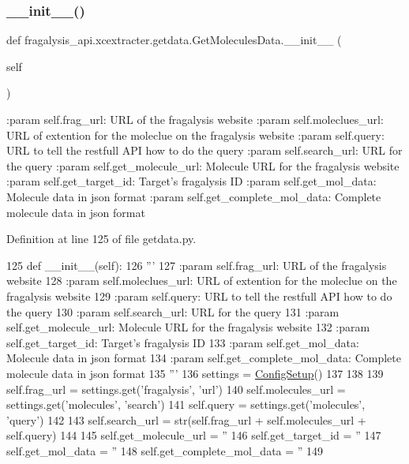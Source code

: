 \subsubsection{\texorpdfstring{\+\_\+\+\_\+init\+\_\+\+\_\+()}{\_\_init\_\_()}}
{\footnotesize\ttfamily def fragalysis\+\_\+api.\+xcextracter.\+getdata.\+Get\+Molecules\+Data.\+\_\+\+\_\+init\+\_\+\+\_\+ (\begin{DoxyParamCaption}\item[{}]{self }\end{DoxyParamCaption})}

\begin{DoxyVerb}:param self.frag_url: URL of the fragalysis website
:param self.moleclues_url: URL of extention for the moleclue on the fragalysis website
:param self.query: URL to tell the restfull API how to do the query
:param self.search_url: URL for the query 
:param self.get_molecule_url: Molecule URL for the fragalysis website
:param self.get_target_id: Target's fragalysis ID 
:param self.get_mol_data: Molecule data in json format
:param self.get_complete_mol_data: Complete molecule data in json format
\end{DoxyVerb}
 

Definition at line 125 of file getdata.\+py.


\begin{DoxyCode}
125     \textcolor{keyword}{def }\_\_init\_\_(self):
126         \textcolor{stringliteral}{'''}
127 \textcolor{stringliteral}{        :param self.frag\_url: URL of the fragalysis website}
128 \textcolor{stringliteral}{        :param self.moleclues\_url: URL of extention for the moleclue on the fragalysis website}
129 \textcolor{stringliteral}{        :param self.query: URL to tell the restfull API how to do the query}
130 \textcolor{stringliteral}{        :param self.search\_url: URL for the query }
131 \textcolor{stringliteral}{        :param self.get\_molecule\_url: Molecule URL for the fragalysis website}
132 \textcolor{stringliteral}{        :param self.get\_target\_id: Target's fragalysis ID }
133 \textcolor{stringliteral}{        :param self.get\_mol\_data: Molecule data in json format}
134 \textcolor{stringliteral}{        :param self.get\_complete\_mol\_data: Complete molecule data in json format}
135 \textcolor{stringliteral}{        '''}
136         settings = \hyperlink{namespacefragalysis__api_1_1xcglobalscripts_1_1set__config_a9b5445f82604ad45c1e85e2b07e4a317}{ConfigSetup}()
137 
138 
139         self.frag\_url = settings.get(\textcolor{stringliteral}{'fragalysis'}, \textcolor{stringliteral}{'url'})
140         self.molecules\_url = settings.get(\textcolor{stringliteral}{'molecules'}, \textcolor{stringliteral}{'search'})
141         self.query = settings.get(\textcolor{stringliteral}{'molecules'}, \textcolor{stringliteral}{'query'})
142 
143         self.search\_url = str(self.frag\_url + self.molecules\_url + self.query)
144 
145         self.get\_molecule\_url = \textcolor{stringliteral}{''}
146         self.get\_target\_id = \textcolor{stringliteral}{''}
147         self.get\_mol\_data = \textcolor{stringliteral}{''}
148         self.get\_complete\_mol\_data = \textcolor{stringliteral}{''}
149 
\end{DoxyCode}


